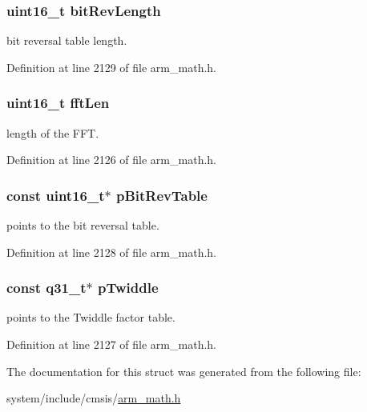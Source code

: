 \subsubsection[{\texorpdfstring{bit\+Rev\+Length}{bitRevLength}}]{\setlength{\rightskip}{0pt plus 5cm}uint16\+\_\+t bit\+Rev\+Length}\hypertarget{structarm__cfft__instance__q31_a65e1b3e327b8fab9404287ed8f347cc8}{}\label{structarm__cfft__instance__q31_a65e1b3e327b8fab9404287ed8f347cc8}
bit reversal table length. 

Definition at line 2129 of file arm\+\_\+math.\+h.

\subsubsection[{\texorpdfstring{fft\+Len}{fftLen}}]{\setlength{\rightskip}{0pt plus 5cm}uint16\+\_\+t fft\+Len}\hypertarget{structarm__cfft__instance__q31_ab8db3bbe7c61e6bb8ca2a55e3446e11a}{}\label{structarm__cfft__instance__q31_ab8db3bbe7c61e6bb8ca2a55e3446e11a}
length of the F\+FT. 

Definition at line 2126 of file arm\+\_\+math.\+h.

\subsubsection[{\texorpdfstring{p\+Bit\+Rev\+Table}{pBitRevTable}}]{\setlength{\rightskip}{0pt plus 5cm}const uint16\+\_\+t$\ast$ p\+Bit\+Rev\+Table}\hypertarget{structarm__cfft__instance__q31_a3b229432d381b0a511a9cdbe3aa74e78}{}\label{structarm__cfft__instance__q31_a3b229432d381b0a511a9cdbe3aa74e78}
points to the bit reversal table. 

Definition at line 2128 of file arm\+\_\+math.\+h.

\subsubsection[{\texorpdfstring{p\+Twiddle}{pTwiddle}}]{\setlength{\rightskip}{0pt plus 5cm}const {\bf q31\+\_\+t}$\ast$ p\+Twiddle}\hypertarget{structarm__cfft__instance__q31_a9760c603af5d85652496dbffd63a8a2e}{}\label{structarm__cfft__instance__q31_a9760c603af5d85652496dbffd63a8a2e}
points to the Twiddle factor table. 

Definition at line 2127 of file arm\+\_\+math.\+h.



The documentation for this struct was generated from the following file\+:\begin{DoxyCompactItemize}
\item 
system/include/cmsis/\hyperlink{arm__math_8h}{arm\+\_\+math.\+h}\end{DoxyCompactItemize}
